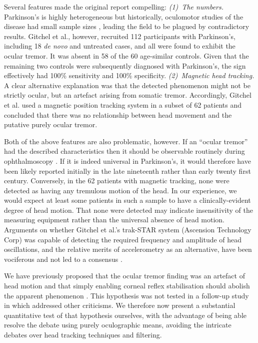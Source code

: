 \documentclass[jou,a4paper]{apa6}
\begin{document}
Several features made the original report compelling: \textit{(1)~The numbers.} Parkinson's is highly heterogeneous but historically, oculomotor studies of the disease had small sample sizes \citep{Anderson2013Eye-movements-i}, leading the field to be plagued by contradictory results.  Gitchel et al., however, recruited 112 participants with Parkinson's, including 18 \textit{de novo} and untreated cases, and all were found to exhibit the ocular tremor. It was absent in 58 of the 60 age-similar controls. Given that the remaining two controls were subsequently diagnosed with Parkinson's, the sign effectively had 100\% sensitivity and 100\% specificity. \textit{(2)~Magnetic head tracking.} A clear alternative explanation was that the detected phenomenon might not be strictly ocular, but an artefact arising from somatic tremor. Accordingly, Gitchel et al. used a magnetic position tracking system in a subset of 62 patients and concluded that there was no relationship between head movement and the putative purely ocular tremor.

Both of the above features are also problematic, however. If an ``ocular tremor'' had the described characteristics then it should be observable routinely during ophthalmoscopy \citep{Leigh2013Tremor-of-the-e}. If it is indeed universal in Parkinson's, it would therefore have been likely reported initially in the late nineteenth rather than early twenty first century. Conversely, in the 62 patients with magnetic tracking, none were detected as having any tremulous motion of the head. In our experience, we would expect at least some patients in such a sample to have a clinically-evident degree of head motion. That none were detected may indicate insensitivity of the measuring equipment rather than the universal absence of head motion. Arguments on whether Gitchel et al.'s trak-STAR system (Ascension Technology Corp) was capable of detecting the required frequency and amplitude of head oscillations, and the relative merits of accelerometry as an alternative, have been vociferous and not led to a consensus \citep{MacAskill2013Ocular-tremor-i,Saifee2014Tremor-of-the-e,Kaski2013Eye-oscillation,Baron2013Ocular-tremor-i,Baron2014Scientific-data,Gitchel2014Experimental-su}. 

We have previously proposed that the ocular tremor finding was an artefact of head motion and that simply enabling corneal reflex stabilisation should abolish the apparent phenomenon \citep{MacAskill2013Ocular-tremor-i}. This hypothesis was not tested in a follow-up study in which \citet{Gitchel2014Experimental-su} addressed other criticisms. We therefore now present a substantial quantitative test of that hypothesis ourselves, with the advantage of being able resolve the debate using purely oculographic means, avoiding the intricate debates over head tracking techniques and filtering.
\end{document}

